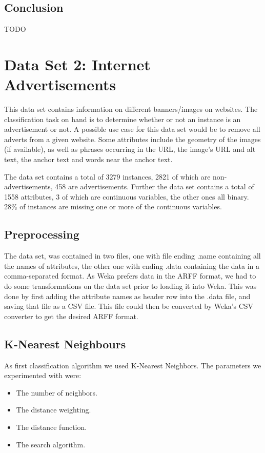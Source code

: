 \documentclass{sig-alternate-05-2015}
\begin{document}
\subsection{Conclusion}
TODO\\


\section{Data Set 2: Internet Advertisements}
This data set contains information on different banners/images on websites. The classification task on hand is to determine whether or not an instance is an advertisement or not. A possible use case for this data set would be to remove all adverts from a given website. Some attributes include the geometry of the images (if available), as well as phrases occurring in the URL, the image's URL and alt text, the anchor text and words near the anchor text.

The data set contains a total of 3279 instances, 2821 of which are non-advertisements, 458 are advertisements. Further the data set contains a total of 1558 attributes, 3 of which are continuous variables, the other ones all binary. 28\% of instances are missing one or more of the continuous variables.


\subsection{Preprocessing}
The data set, was contained in two files, one with file ending .name containing all the names of attributes, the other one with ending .data containing the data in a comma-separated format. As Weka prefers data in the ARFF format, we had to do some transformations on the data set prior to loading it into Weka. This was done by first adding the attribute names as header row into the .data file, and saving that file as a CSV file. This file could then be converted by Weka's CSV converter to get the desired ARFF format.

\subsection{K-Nearest Neighbours}
As first classification algorithm we used K-Nearest Neighbors. The parameters we experimented with were:

\begin{itemize}
\item The number of neighbors.
\item The distance weighting.
\item The distance function.
\item The search algorithm.
\end{itemize}
\end{document}
